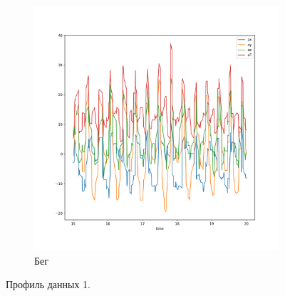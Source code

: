 \documentclass[12pt, fleqn, unicode]{article}
\begin{document}
\begin{figure}
\begin{subfigure}[b]{0.5\textwidth}
        \includegraphics[width=.9\linewidth]{../pics/raw_run.png}
        \caption{Бег}
        \label{fig:sfig2}
    \end{subfigure}
    \caption{Профиль данных 1.}
    \label{fig:fig}
\end{figure}
\end{document}
